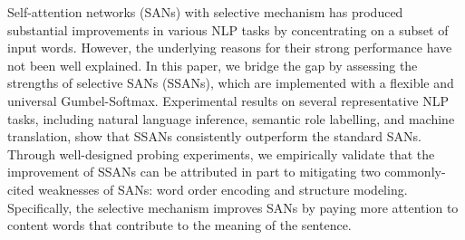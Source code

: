 Self-attention networks (SANs) with selective mechanism has produced substantial improvements in various NLP tasks by concentrating on a subset of input words. However, the underlying reasons for their strong performance have not been well explained. In this paper, we bridge the gap by assessing the strengths of selective SANs (SSANs), which are implemented with a flexible and universal Gumbel-Softmax. Experimental results on several representative NLP tasks, including natural language inference, semantic role labelling, and machine translation, show that SSANs consistently outperform the standard SANs. Through well-designed probing experiments, we empirically validate that the improvement of SSANs can be attributed in part to mitigating two commonly-cited weaknesses of SANs: word order encoding and structure modeling. Specifically, the selective mechanism improves SANs by paying more attention to content words that contribute to the meaning of the sentence.
